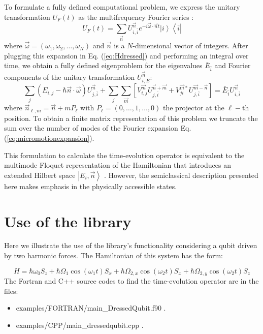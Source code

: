 \documentclass[10pt,a4paper]{article}
\begin{document}
To formulate a fully defined computational problem, we express the unitary transformation $U_F(t)$ as the multifrequency Fourier series \cite{ho1983semiclassical}:
\begin{equation}
U_F(t) = \sum_{\vec{n}} U_{i,\bar{i}}^{\vec{n}} e^{-i\vec{\omega} \cdot \vec{n}t} \left| i \right\rangle \left\langle \bar{i} \right|
\label{eq:micromotionexpansion}
\end{equation}
where $\vec{\omega} = (\omega_1,\omega_2,\ldots,\omega_N)$ and $\vec{n}$ is a $N$-dimensional vector of integers. After plugging this expansion in Eq. (\ref{eq:Hdressed}) and performing an integral over time, we obtain a fully defined eigenproblem for the eigenvalues $\bar{E}_{\bar{i}}$ and Fourier components of the unitary transformation $U_{i,\bar{E}}^{\vec{n}}$:
\begin{equation}
\sum_j(E_{i,j} - \hbar \vec{n} \cdot \vec{\omega})U^{\vec{n}}_{j,\bar{i}} + \sum_{j} \sum_{\vec{m}} \left[ V^{\vec{m}}_{i,j} U^{\vec{n}+\vec{m}}_{j,\bar{i}} + V^{\vec{m}*}_{ji} U^{\vec{m}-\vec{n}}_{j,\bar{i}}\right] = \bar{E}_{\bar{i}}U^{\vec{n}}_{i,\bar{i}}
\label{eq:multimodeeigenproblem}
\end{equation}
where $\vec{n}_{\ell,m} = \vec{n} + m P_{\ell}$ with $P_{\ell} = (0,\ldots, 1, \ldots,0)$ the projector at the $\ell-$th position. To obtain a finite matrix representation of this problem we truncate the sum over the number of modes of the Fourier expansion Eq. (\ref{eq:micromotionexpansion}). 

This formulation to calculate the time-evolution operator is equivalent to the multimode Floquet representation of the Hamiltonian that introduces an extended Hilbert space $\left| E_i,\vec{n} \right\rangle$  \cite{ho1983semiclassical,verdeny2016quasi}. However, the semiclassical description presented here makes emphasis in the physically accessible states. 


\section{Use of the library}

Here we illustrate the use of the library's functionality considering a qubit driven by two harmonic forces.  The Hamiltonian of this system has the form:

\begin{equation}
H = \hbar \omega_0 S_z + \hbar \Omega_1 \cos(\omega_1 t) S_x + \hbar \Omega_{2,x} \cos(\omega_2 t) S_x + \hbar \Omega_{2,y} \cos(\omega_2 t)  S_z
\label{eq:dressedqubitmodel}
\end{equation}
The Fortran and C++ source codes to find the time-evolution operator are in the files:
\begin{itemize}
\item    examples/FORTRAN/main\_DressedQubit.f90  .
\item    examples/CPP/main\_dressedqubit.cpp  .
\end{itemize}
\end{document}
